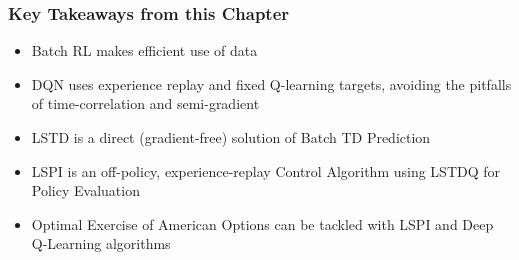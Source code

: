 \documentclass[handout]{beamer}
\begin{document}
\begin{frame}
\frametitle{Key Takeaways from this Chapter}
\pause
\begin{itemize}[<+->]
\item Batch RL makes efficient use of data
\item DQN uses experience replay and fixed Q-learning targets, avoiding the pitfalls of time-correlation and semi-gradient
\item LSTD is a direct (gradient-free) solution of Batch TD Prediction
\item LSPI is an off-policy, experience-replay Control Algorithm using LSTDQ for Policy Evaluation
\item Optimal Exercise of American Options can be tackled with LSPI and Deep Q-Learning algorithms
\end{itemize}
\end{frame}
\end{document}
